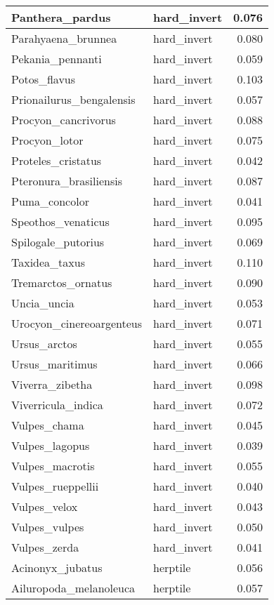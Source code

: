 \begin{table}
\begin{tabular}[t]{l|l|r}
\hline
Panthera\_pardus & hard\_invert & 0.076\\
\hline
Parahyaena\_brunnea & hard\_invert & 0.080\\
\hline
Pekania\_pennanti & hard\_invert & 0.059\\
\hline
Potos\_flavus & hard\_invert & 0.103\\
\hline
Prionailurus\_bengalensis & hard\_invert & 0.057\\
\hline
Procyon\_cancrivorus & hard\_invert & 0.088\\
\hline
Procyon\_lotor & hard\_invert & 0.075\\
\hline
Proteles\_cristatus & hard\_invert & 0.042\\
\hline
Pteronura\_brasiliensis & hard\_invert & 0.087\\
\hline
Puma\_concolor & hard\_invert & 0.041\\
\hline
Speothos\_venaticus & hard\_invert & 0.095\\
\hline
Spilogale\_putorius & hard\_invert & 0.069\\
\hline
Taxidea\_taxus & hard\_invert & 0.110\\
\hline
Tremarctos\_ornatus & hard\_invert & 0.090\\
\hline
Uncia\_uncia & hard\_invert & 0.053\\
\hline
Urocyon\_cinereoargenteus & hard\_invert & 0.071\\
\hline
Ursus\_arctos & hard\_invert & 0.055\\
\hline
Ursus\_maritimus & hard\_invert & 0.066\\
\hline
Viverra\_zibetha & hard\_invert & 0.098\\
\hline
Viverricula\_indica & hard\_invert & 0.072\\
\hline
Vulpes\_chama & hard\_invert & 0.045\\
\hline
Vulpes\_lagopus & hard\_invert & 0.039\\
\hline
Vulpes\_macrotis & hard\_invert & 0.055\\
\hline
Vulpes\_rueppellii & hard\_invert & 0.040\\
\hline
Vulpes\_velox & hard\_invert & 0.043\\
\hline
Vulpes\_vulpes & hard\_invert & 0.050\\
\hline
Vulpes\_zerda & hard\_invert & 0.041\\
\hline
Acinonyx\_jubatus & herptile & 0.056\\
\hline
Ailuropoda\_melanoleuca & herptile & 0.057\\

\end{tabular}
\end{table}

